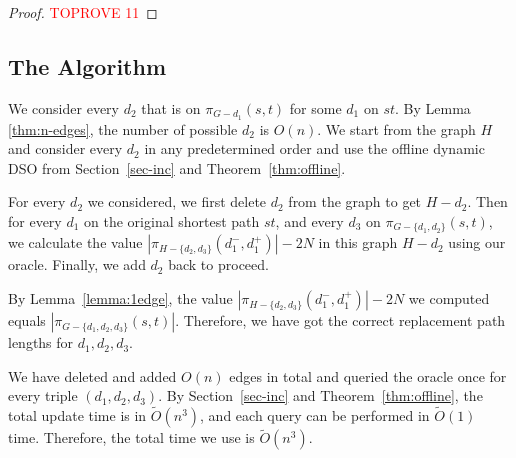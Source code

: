 \documentclass[11pt]{article}
\theoremstyle{plain}
\theoremstyle{definition}
\newcommand{\too}[1]{\tilde{O}({#1})}
\newcommand{\set}[1]{\{ #1 \}}
\newcommand{\og}[3]{\pi_{G-#3}\left(#1,#2\right)}
\newcommand{\hg}[3]{\pi_{H-#3}\left(#1,#2\right)}
\begin{document}
\begin{center}
 \end{center}

\begin{proof}\textcolor{red}{TOPROVE 11}\end{proof}

\subsection{The Algorithm}

We consider every $d_2$ that is on $\og{s}{t}{d_1}$ for some $d_1$ on $st$. By Lemma \ref{thm:n-edges}, the number of possible $d_2$ is $O(n)$. We start from the graph $H$ and consider every $d_2$ in any predetermined order and use the offline dynamic DSO from Section~\ref{sec-inc} and Theorem~\ref{thm:offline}. 

For every $d_2$ we considered, we first delete $d_2$ from the graph to get $H-d_2$. Then for every $d_1$ on the original shortest path $st$, and every $d_3$ on $\og{s}{t}{\set{d_1, d_2}}$, we calculate the value $|\hg{d_1^-}{d_1^+}{\set{d_2, d_3}}|-2N$ in this graph $H-d_2$ using our oracle. Finally, we add $d_2$ back to proceed.

By Lemma~\ref{lemma:1edge}, the value $|\hg{d_1^-}{d_1^+}{\set{d_2, d_3}}|-2N$ we computed equals $|\og{s}{t}{\set{d_1, d_2, d_3}}|$. Therefore, we have got the correct replacement path lengths for ${d_1,d_2,d_3}$.

We have deleted and added $O(n)$ edges in total and queried the oracle once for every triple $(d_1,d_2,d_3)$. By Section~\ref{sec-inc} and Theorem~\ref{thm:offline}, the total update time is in $\too{n^3}$, and each query can be performed in $\tilde{O}(1)$ time. Therefore, the total time we use is $\too{n^3}$. 
\end{document}
